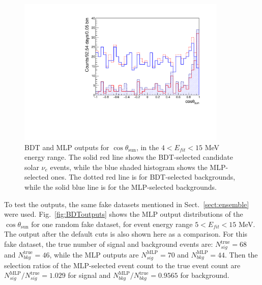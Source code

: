 \begin{figure}[!htb]
	\centering
	\includegraphics[width=10cm]{cosThetaToSun_4to15_output.pdf}
	\caption[BDT and MLP outputs for the $\cos\theta_\mathrm{sun}$ ($4<E_{fit}<15$ MeV).]{BDT and MLP outputs for $\cos\theta_\mathrm{sun}$, in the $4<E_{fit}<15$ MeV energy range. The solid red line shows the BDT-selected candidate solar $\nu_e$ events, while the blue shaded histogram shows the MLP-selected ones. The dotted red line is for BDT-selected backgrounds, while the solid blue line is for the MLP-selected backgrounds.\label{fig:cosThetaToSun_4to15_output}}
\end{figure}

To test the outputs, the same fake datasets mentioned in Sect.~\ref{sect:ensemble} were used. Fig.~\ref{fig:BDToutputs} shows the MLP output distributions of the $\cos\theta_\mathrm{sun}$ for one random fake dataset, for event energy range $5<E_{fit}<15$ MeV. The output after the default cuts is also shown here as a comparison. For this fake dataset, the true number of signal and background events are: $N^\mathrm{true}_{sig}=68$ and $N^\mathrm{true}_{bkg}=46$, while the MLP outputs are $N^\mathrm{MLP}_{sig}=70$ and $N^\mathrm{MLP}_{bkg}=44$. Then the selection ratios of the MLP-selected event count to the true event count are $N^\mathrm{MLP}_{sig}/N^\mathrm{true}_{sig}=1.029$  for signal and $N^\mathrm{MLP}_{bkg}/N^\mathrm{true}_{bkg}=0.9565$ for background.


